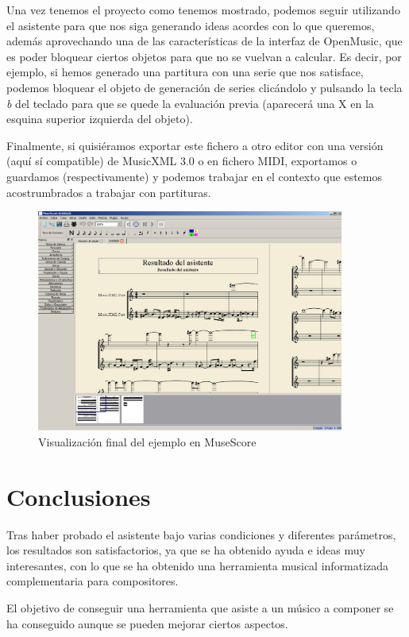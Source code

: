 \documentclass[a4paper,openany,12pt]{memoir}
\begin{document}
Una vez tenemos el proyecto como tenemos mostrado, podemos seguir utilizando el asistente para que nos siga generando ideas acordes con lo que queremos, además aprovechando una de las características de la interfaz de OpenMusic, que es poder bloquear ciertos objetos para que no se vuelvan a calcular. Es decir, por ejemplo, si hemos generado una partitura con una serie que nos satisface, podemos bloquear el objeto de generación de series clicándolo y pulsando la tecla \emph{b} del teclado para que se quede la evaluación previa (aparecerá una X en la esquina superior izquierda del objeto).

Finalmente, si quisiéramos exportar este fichero a otro editor con una versión (aquí sí compatible) de MusicXML 3.0 o en fichero MIDI, exportamos o guardamos (respectivamente) y podemos trabajar en el contexto que estemos acostrumbrados a trabajar con partituras.


\begin{figure}
\centering
\includegraphics[width=0.9\textwidth]{img/musescore.png}
\caption{Visualización final del ejemplo en MuseScore} \label{fig:musescore}
\end{figure}

\chapter{Conclusiones}\label{conclusiones}
Tras haber probado el asistente bajo varias condiciones y diferentes parámetros, los resultados son satisfactorios, ya que se ha obtenido ayuda e ideas muy interesantes, con lo que se ha obtenido una herramienta musical informatizada complementaria para compositores.

El objetivo de conseguir una herramienta que asiste a un músico a componer se ha conseguido aunque se pueden mejorar ciertos aspectos.
\end{document}
